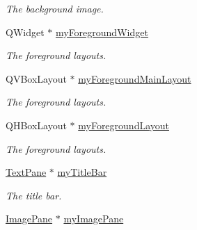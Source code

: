 \begin{DoxyCompactItemize}
\begin{DoxyCompactList}\small\item\em The background image. \end{DoxyCompactList}\item 
\hypertarget{class_u_i_1_1_folder_browser_a9855d3001f46ba8a79718b80cbe9e411}{Q\-Widget $\ast$ \hyperlink{class_u_i_1_1_folder_browser_a9855d3001f46ba8a79718b80cbe9e411}{my\-Foreground\-Widget}}\label{class_u_i_1_1_folder_browser_a9855d3001f46ba8a79718b80cbe9e411}

\begin{DoxyCompactList}\small\item\em The foreground layouts. \end{DoxyCompactList}\item 
\hypertarget{class_u_i_1_1_folder_browser_aa40aa9cd144d9ea24d20fde2b613f144}{Q\-V\-Box\-Layout $\ast$ \hyperlink{class_u_i_1_1_folder_browser_aa40aa9cd144d9ea24d20fde2b613f144}{my\-Foreground\-Main\-Layout}}\label{class_u_i_1_1_folder_browser_aa40aa9cd144d9ea24d20fde2b613f144}

\begin{DoxyCompactList}\small\item\em The foreground layouts. \end{DoxyCompactList}\item 
\hypertarget{class_u_i_1_1_folder_browser_a70d8cf5a12df8e2275e452dd35a636da}{Q\-H\-Box\-Layout $\ast$ \hyperlink{class_u_i_1_1_folder_browser_a70d8cf5a12df8e2275e452dd35a636da}{my\-Foreground\-Layout}}\label{class_u_i_1_1_folder_browser_a70d8cf5a12df8e2275e452dd35a636da}

\begin{DoxyCompactList}\small\item\em The foreground layouts. \end{DoxyCompactList}\item 
\hypertarget{class_u_i_1_1_folder_browser_a69b3fb324d4807832498f62b44c56256}{\hyperlink{class_u_i_1_1_text_pane}{Text\-Pane} $\ast$ \hyperlink{class_u_i_1_1_folder_browser_a69b3fb324d4807832498f62b44c56256}{my\-Title\-Bar}}\label{class_u_i_1_1_folder_browser_a69b3fb324d4807832498f62b44c56256}

\begin{DoxyCompactList}\small\item\em The title bar. \end{DoxyCompactList}\item 
\hypertarget{class_u_i_1_1_folder_browser_a2c72167b868772dac8f10acfa3491e63}{\hyperlink{class_u_i_1_1_image_pane}{Image\-Pane} $\ast$ \hyperlink{class_u_i_1_1_folder_browser_a2c72167b868772dac8f10acfa3491e63}{my\-Image\-Pane}}\label{class_u_i_1_1_folder_browser_a2c72167b868772dac8f10acfa3491e63}


\end{DoxyCompactItemize}
